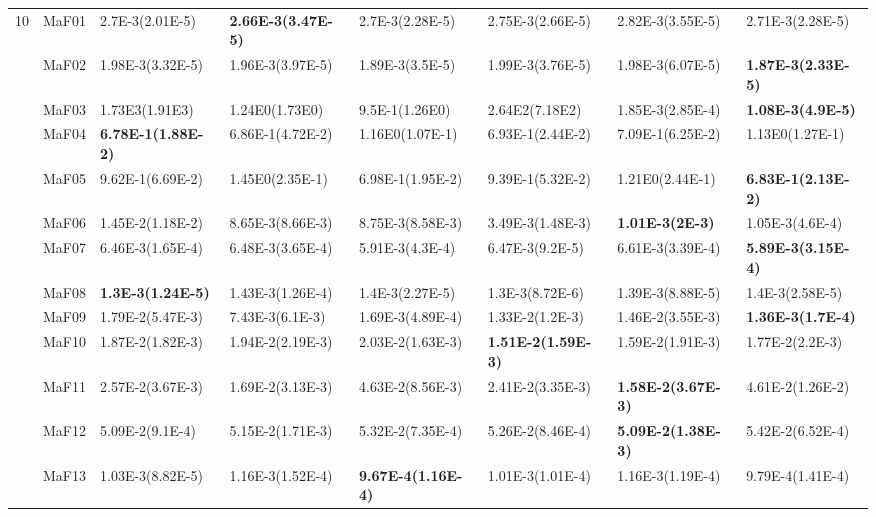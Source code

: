 \documentclass[]{article}
\begin{document}
\begin{landscape}
\begin{table}
\begin{footnotesize}
\begin{tabular}{|l|l|l|l|l|l|l|l|}
\multirow{15}{*}{10} & MaF01 & \cellcolor{gray95} 2.7E-3(2.01E-5) & \cellcolor{gray95} {\bf 2.66E-3(3.47E-5)} & \cellcolor{gray95} 2.7E-3(2.28E-5) & 2.75E-3(2.66E-5) & 2.82E-3(3.55E-5) & 2.71E-3(2.28E-5)\\
 & MaF02 & 1.98E-3(3.32E-5) & 1.96E-3(3.97E-5) & \cellcolor{gray95} 1.89E-3(3.5E-5) & 1.99E-3(3.76E-5) & 1.98E-3(6.07E-5) & \cellcolor{gray95} {\bf 1.87E-3(2.33E-5)}\\
 & MaF03 & 1.73E3(1.91E3) & 1.24E0(1.73E0) & 9.5E-1(1.26E0) & 2.64E2(7.18E2) & \cellcolor{gray95} 1.85E-3(2.85E-4) & \cellcolor{gray95} {\bf 1.08E-3(4.9E-5)}\\
 & MaF04 & \cellcolor{gray95} {\bf 6.78E-1(1.88E-2)} & \cellcolor{gray95} 6.86E-1(4.72E-2) & 1.16E0(1.07E-1) & \cellcolor{gray95} 6.93E-1(2.44E-2) & \cellcolor{gray95} 7.09E-1(6.25E-2) & 1.13E0(1.27E-1)\\
 & MaF05 & 9.62E-1(6.69E-2) & 1.45E0(2.35E-1) & \cellcolor{gray95} 6.98E-1(1.95E-2) & 9.39E-1(5.32E-2) & 1.21E0(2.44E-1) & \cellcolor{gray95} {\bf 6.83E-1(2.13E-2)}\\
 & MaF06 & 1.45E-2(1.18E-2) & 8.65E-3(8.66E-3) & 8.75E-3(8.58E-3) & \cellcolor{gray95} 3.49E-3(1.48E-3) & \cellcolor{gray95} {\bf 1.01E-3(2E-3)} & \cellcolor{gray95} 1.05E-3(4.6E-4)\\
 & MaF07 & 6.46E-3(1.65E-4) & 6.48E-3(3.65E-4) & \cellcolor{gray95} 5.91E-3(4.3E-4) & 6.47E-3(9.2E-5) & 6.61E-3(3.39E-4) & \cellcolor{gray95} {\bf 5.89E-3(3.15E-4)}\\
 & MaF08 & \cellcolor{gray95} {\bf 1.3E-3(1.24E-5)} & 1.43E-3(1.26E-4) & 1.4E-3(2.27E-5) & \cellcolor{gray95} 1.3E-3(8.72E-6) & 1.39E-3(8.88E-5) & 1.4E-3(2.58E-5)\\
 & MaF09 & 1.79E-2(5.47E-3) & 7.43E-3(6.1E-3) & \cellcolor{gray95} 1.69E-3(4.89E-4) & 1.33E-2(1.2E-3) & 1.46E-2(3.55E-3) & \cellcolor{gray95} {\bf 1.36E-3(1.7E-4)}\\
 & MaF10 & 1.87E-2(1.82E-3) & 1.94E-2(2.19E-3) & 2.03E-2(1.63E-3) & \cellcolor{gray95} {\bf 1.51E-2(1.59E-3)} & \cellcolor{gray95} 1.59E-2(1.91E-3) & 1.77E-2(2.2E-3)\\
 & MaF11 & 2.57E-2(3.67E-3) & \cellcolor{gray95} 1.69E-2(3.13E-3) & 4.63E-2(8.56E-3) & 2.41E-2(3.35E-3) & \cellcolor{gray95} {\bf 1.58E-2(3.67E-3)} & 4.61E-2(1.26E-2)\\
 & MaF12 & \cellcolor{gray95} 5.09E-2(9.1E-4) & \cellcolor{gray95} 5.15E-2(1.71E-3) & 5.32E-2(7.35E-4) & 5.26E-2(8.46E-4) & \cellcolor{gray95} {\bf 5.09E-2(1.38E-3)} & 5.42E-2(6.52E-4)\\
 & MaF13 & \cellcolor{gray95} 1.03E-3(8.82E-5) & 1.16E-3(1.52E-4) & \cellcolor{gray95} {\bf 9.67E-4(1.16E-4)} & \cellcolor{gray95} 1.01E-3(1.01E-4) & 1.16E-3(1.19E-4) & \cellcolor{gray95} 9.79E-4(1.41E-4)\\

\end{tabular}
\end{footnotesize}
\end{table}
\end{landscape}
\end{document}
